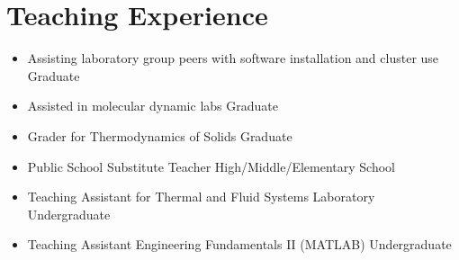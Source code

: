 \section{Teaching Experience}

\begin{itemize}
    \item Assisting laboratory group peers with software installation and cluster use \hfill Graduate
    \item Assisted in molecular dynamic labs \hfill Graduate
    \item Grader for Thermodynamics of Solids \hfill Graduate
    \item Public School Substitute Teacher \hfill High/Middle/Elementary School
    \item Teaching Assistant for Thermal and Fluid Systems Laboratory \hfill Undergraduate
    \item Teaching Assistant Engineering Fundamentals II (MATLAB) \hfill Undergraduate
\end{itemize}
